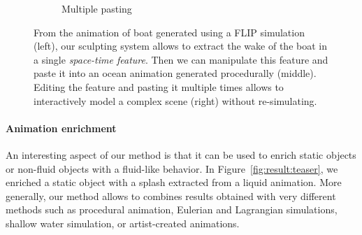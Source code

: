 \begin{figure}[!h]
\begin{subfigure}[b]{0.40\linewidth}
		\caption{\label{fig:result_detail:paste_2}\scriptsize{Multiple pasting}}
	\end{subfigure}
	\caption[Fluid sculpting: Boat wake]{\label{fig:result:boatWake}
		From the animation of boat generated using a FLIP simulation (left), our sculpting system allows to extract the wake of the boat in a single \emph{space-time feature}. Then we can manipulate this feature and paste it into an ocean animation generated procedurally (middle). Editing the feature and pasting it multiple times allows to interactively model a complex scene (right) without re-simulating.
	}
\end{figure}

\paragraph{Animation enrichment}
An interesting aspect of our method is that it can be used to enrich static objects or non-fluid objects with a fluid-like behavior. 
In Figure~\ref{fig:result:teaser}, we enriched a static object with a splash extracted from a liquid animation.
More generally, our method allows to combines results obtained with very different methods such as procedural animation, Eulerian and Lagrangian simulations, shallow water simulation, or artist-created animations.

